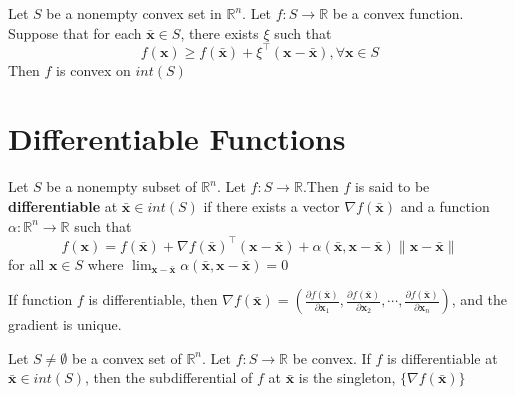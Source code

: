 			\begin{theorem}
				Let $S$ be a nonempty convex set in $\mathbb{R}^n$. Let $f: S\rightarrow \mathbb{R}$ be a convex function. Suppose that for each $\bar{\mathbf{x}} \in S$, there exists $\xi$ such that
				\begin{equation}
				 	f(\mathbf{x}) \ge f(\bar{\mathbf{x}}) + \xi^\top(\mathbf{x} - \bar{\mathbf{x}}), \forall \mathbf{x} \in S
				\end{equation} 
				Then $f$ is convex on $int(S)$
			\end{theorem}


		\section{Differentiable Functions}
			\begin{definition}
			 	Let $S$ be a nonempty subset of $\mathbb{R}^n$. Let $f: S\rightarrow \mathbb{R}$.Then $f$ is said to be \textbf{differentiable} at $\bar{\mathbf{x}} \in int(S)$ if there exists a vector $\nabla f(\bar{\mathbf{x}})$ and a function $\alpha: \mathbb{R}^n \rightarrow \mathbb{R}$ such that
			 	\begin{equation}
			 		f(\mathbf{x}) = f(\bar{\mathbf{x}}) + \nabla f(\bar{\mathbf{x}})^\top (\mathbf{x} - \bar{\mathbf{x}}) + \alpha(\bar{\mathbf{x}}, \mathbf{x} - \bar{\mathbf{x}})\|\mathbf{x} - \bar{\mathbf{x}}\|
			 	\end{equation}
			 	for all $\mathbf{x} \in S$ where $\lim_{\mathbf{x} - \bar{\mathbf{x}}}\alpha (\bar{\mathbf{x}}, \mathbf{x} - \bar{\mathbf{x}}) = 0$
			\end{definition}

			\begin{remark}
			 	If function $f$ is differentiable, then $\nabla f(\bar{\mathbf{x}}) = (\frac{\partial f(\bar{\mathbf{x}})}{\partial \mathbf{x}_1}, \frac{\partial f(\bar{\mathbf{x}})}{\partial \mathbf{x}_2}, \cdots, \frac{\partial f(\bar{\mathbf{x}})}{\partial \mathbf{x}_n})$, and the gradient is unique.
			\end{remark}

			\begin{lemma}
				Let $S\neq \emptyset$ be a convex set of $\mathbb{R}^n$. Let $f: S\rightarrow \mathbb{R}$ be convex. If $f$ is differentiable at $\bar{\mathbf{x}} \in int(S)$, then the subdifferential of $f$ at $\bar{\mathbf{x}}$ is the singleton, $\{\nabla f(\bar{\mathbf{x}})\}$
			\end{lemma}


